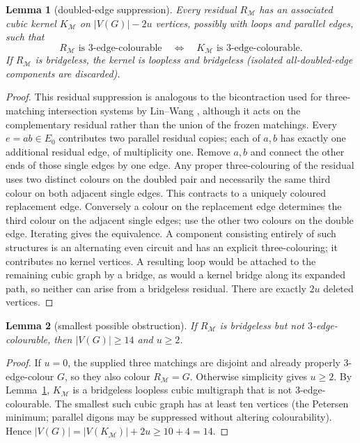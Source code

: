 \documentclass[11pt]{article}
\newtheorem{lemma}{Lemma}
\newcommand{\PM}{\mathcal M}
\begin{document}
\begin{lemma}[doubled-edge suppression]\label{lem:kernel}
Every residual $R_{\PM}$ has an associated cubic kernel $K_{\PM}$ on $|V(G)|-2u$ vertices, possibly with loops and parallel edges, such that
\[
R_{\PM}\text{ is $3$-edge-colourable}\quad\Longleftrightarrow\quad K_{\PM}\text{ is $3$-edge-colourable}.
\]
If $R_{\PM}$ is bridgeless, the kernel is loopless and bridgeless (isolated all-doubled-edge components are discarded).
\end{lemma}
\begin{proof}
This residual suppression is analogous to the bicontraction used for three-matching intersection systems by Lin--Wang \cite{LW18}, although it acts on the complementary residual rather than the union of the frozen matchings. Every $e=ab\in E_0$ contributes two parallel residual copies; each of $a,b$ has exactly one additional residual edge, of multiplicity one. Remove $a,b$ and connect the other ends of those single edges by one edge. Any proper three-colouring of the residual uses two distinct colours on the doubled pair and necessarily the same third colour on both adjacent single edges. This contracts to a uniquely coloured replacement edge. Conversely a colour on the replacement edge determines the third colour on the adjacent single edges; use the other two colours on the double edge. Iterating gives the equivalence. A component consisting entirely of such structures is an alternating even circuit and has an explicit three-colouring; it contributes no kernel vertices. A resulting loop would be attached to the remaining cubic graph by a bridge, as would a kernel bridge along its expanded path, so neither can arise from a bridgeless residual. There are exactly $2u$ deleted vertices.
\end{proof}

\begin{lemma}[smallest possible obstruction]\label{lem:lower}
If $R_{\PM}$ is bridgeless but not $3$-edge-colourable, then $|V(G)|\ge14$ and $u\ge2$.
\end{lemma}
\begin{proof}
If $u=0$, the supplied three matchings are disjoint and already properly $3$-edge-colour $G$, so they also colour $R_{\PM}=G$. Otherwise simplicity gives $u\ge2$. By Lemma~\ref{lem:kernel}, $K_{\PM}$ is a bridgeless loopless cubic multigraph that is not $3$-edge-colourable. The smallest such cubic graph has at least ten vertices (the Petersen minimum; parallel digons may be suppressed without altering colourability). Hence $|V(G)|=|V(K_{\PM})|+2u\ge10+4=14$.
\end{proof}
\end{document}
